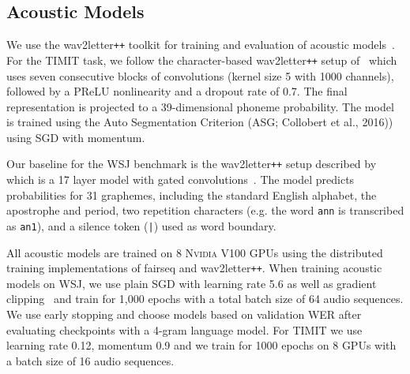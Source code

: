 \documentclass{article} \pdfoutput=1
\newcommand{\wavtoletter}{wav2letter\texttt{+\!+}}
\begin{document}
\subsection{Acoustic Models}

We use the \wavtoletter{} toolkit for training and evaluation of acoustic models~\citep{pratap2018w2l}.
For the TIMIT task, we follow the character-based \wavtoletter{} setup of~\citet{zeghidour2018filters} which uses seven consecutive blocks of convolutions (kernel size \num{5} with \num{1000} channels), followed by a PReLU nonlinearity and a dropout rate of \num{0.7}.
The final representation is projected to a 39-dimensional phoneme probability.
The model is trained using the Auto Segmentation Criterion (ASG; Collobert et al., 2016)\nocite{collobert2016wav2letter}) using SGD with momentum.

Our baseline for the WSJ benchmark is the \wavtoletter{} setup described by~\citet{collobert2018diffbeam} which is a 17 layer model with gated convolutions~\citep{dauphin2016convlm}.
The model predicts probabilities for 31 graphemes, including the standard English alphabet, the apostrophe and period, two repetition characters (e.g. the word \texttt{ann} is transcribed as \texttt{an1}), and a silence token (\texttt{|}) used as word boundary.

All acoustic models are trained on 8 \textsc{Nvidia} V100 GPUs using the distributed training implementations of fairseq and \wavtoletter{}.
When training acoustic models on WSJ, we use plain SGD with learning rate 5.6 as well as gradient clipping~\citep{collobert2018diffbeam} and train for 1,000 epochs with a total batch size of 64 audio sequences.
We use early stopping and choose models based on validation WER after evaluating checkpoints with a 4-gram language model.
For TIMIT we use learning rate 0.12, momentum 0.9 and we train for \num{1000} epochs on 8 GPUs with a batch size of 16 audio sequences.
\end{document}
